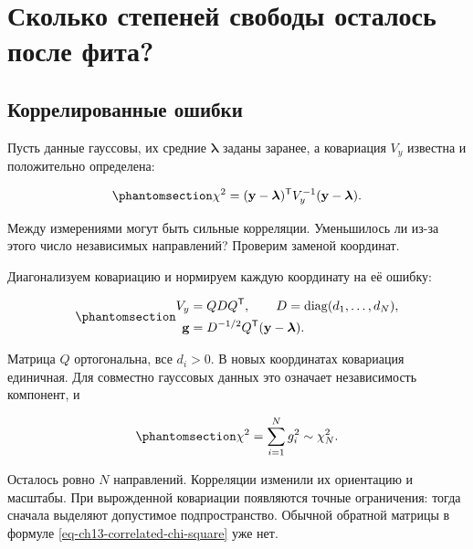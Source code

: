 \documentclass[
  russian,
  11pt,
  a4paper,
  open=any]{scrbook}
\begin{document}
\section{Сколько степеней свободы осталось после
фита?}\label{ux441ux43aux43eux43bux44cux43aux43e-ux441ux442ux435ux43fux435ux43dux435ux439-ux441ux432ux43eux431ux43eux434ux44b-ux43eux441ux442ux430ux43bux43eux441ux44c-ux43fux43eux441ux43bux435-ux444ux438ux442ux430}

\subsection{Коррелированные
ошибки}\label{ux43aux43eux440ux440ux435ux43bux438ux440ux43eux432ux430ux43dux43dux44bux435-ux43eux448ux438ux431ux43aux438}

Пусть данные гауссовы, их средние \(\boldsymbol\lambda\) заданы заранее,
а ковариация \(V_y\) известна и положительно определена:

\begin{equation}\protect\phantomsection\label{eq-ch13-correlated-chi-square}{
\chi^2=
(\mathbf y-\boldsymbol\lambda)^{\mathsf T}
V_y^{-1}(\mathbf y-\boldsymbol\lambda).
}\end{equation}

Между измерениями могут быть сильные корреляции. Уменьшилось ли из-за
этого число независимых направлений? Проверим заменой координат.

Диагонализуем ковариацию и нормируем каждую координату на её ошибку:

\begin{equation}\protect\phantomsection\label{eq-ch13-whitened-coordinates}{
\begin{aligned}
V_y&=QDQ^{\mathsf T},
\qquad D=\operatorname{diag}(d_1,\ldots,d_N),\\
\mathbf g&=D^{-1/2}Q^{\mathsf T}
(\mathbf y-\boldsymbol\lambda).
\end{aligned}
}\end{equation}

Матрица \(Q\) ортогональна, все \(d_i>0\). В новых координатах
ковариация единичная. Для совместно гауссовых данных это означает
независимость компонент, и

\begin{equation}\protect\phantomsection\label{eq-ch13-correlated-distribution}{
\chi^2=\sum_{i=1}^{N}g_i^2\sim\chi^2_N.
}\end{equation}

Осталось ровно \(N\) направлений. Корреляции изменили их ориентацию и
масштабы. При вырожденной ковариации появляются точные ограничения:
тогда сначала выделяют допустимое подпространство. Обычной обратной
матрицы в формуле \ref{eq-ch13-correlated-chi-square} уже нет.
\end{document}
